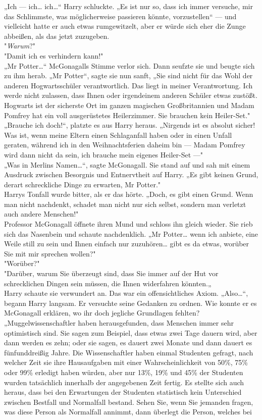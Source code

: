 {„Ich --- ich… ich…“ Harry schluckte. „Es ist nur so, dass ich immer versuche, mir das Schlimmste, was möglicherweise passieren könnte, vorzustellen“ --- und vielleicht hatte er auch etwas rumgewitzelt, aber er würde sich eher die Zunge abbeißen, als das jetzt zuzugeben.\\ "\emph{Warum}?"\\ "Damit ich es verhindern kann!"\\ „Mr Potter…“ McGonagalls Stimme verlor sich. Dann seufzte sie und beugte sich zu ihm herab. „Mr Potter“, sagte sie nun sanft, „Sie sind nicht für das Wohl der anderen Hogwartsschüler verantwortlich. Das liegt in meiner Verantwortung. Ich werde nicht zulassen, dass Ihnen oder irgendeinem anderen Schüler etwas zustößt. Hogwarts ist der sicherste Ort im ganzen magischen Großbritannien und Madam Pomfrey hat ein voll ausgerüstetes Heilerzimmer. Sie brauchen kein Heiler-Set."\\ „Brauche ich doch!“, platzte es aus Harry heraus. „Nirgends ist es absolut sicher! Was ist, wenn meine Eltern einen Schlaganfall haben oder in einen Unfall geraten, während ich in den Weihnachtsferien daheim bin --- Madam Pomfrey wird dann nicht da sein, ich brauche mein eigenes Heiler-Set ---"\\ „Was in Merlins Namen…“, sagte McGonagall. Sie stand auf und sah mit einem Ausdruck zwischen Besorgnis und Entnervtheit auf Harry. „Es gibt keinen Grund, derart schreckliche Dinge zu erwarten, Mr Potter."\\ Harrys Tonfall wurde bitter, als er das hörte. „Doch, es gibt einen Grund. Wenn man nicht nachdenkt, schadet man nicht nur sich selbst, sondern man verletzt auch andere Menschen!"\\ Professor McGonagall öffnete ihren Mund und schloss ihn gleich wieder. Sie rieb sich das Nasenbein und schaute nachdenklich. „Mr Potter… wenn ich anbiete, eine Weile still zu sein und Ihnen einfach nur zuzuhören… gibt es da etwas, worüber Sie mit mir sprechen wollen?"\\ "Worüber?"\\ "Darüber, warum Sie überzeugt sind, dass Sie immer auf der Hut vor schrecklichen Dingen sein müssen, die Ihnen widerfahren könnten.„\\ Harry schaute sie verwundert an. Das war ein offensichtliches Axiom. „Also…“, begann Harry langsam. Er versuchte seine Gedanken zu ordnen. Wie konnte er es McGonagall erklären, wo ihr doch jegliche Grundlagen fehlten? „Muggelwissenschaftler haben herausgefunden, dass Menschen immer sehr optimistisch sind. Sie sagen zum Beispiel, dass etwas zwei Tage dauern wird, aber dann werden es zehn; oder sie sagen, es dauert zwei Monate und dann dauert es fünfunddreißig Jahre. Die Wissenschaftler haben einmal Studenten gefragt, nach welcher Zeit sie ihre Hausaufgaben mit einer Wahrscheinlichkeit von 50\%, 75\% oder 99\% erledigt haben würden, aber nur 13\%, 19\% und 45\% der Studenten wurden tatsächlich innerhalb der angegebenen Zeit fertig. Es stellte sich auch heraus, dass bei den Erwartungen der Studenten statistisch kein Unterschied zwischen Bestfall und Normalfall bestand. Sehen Sie, wenn Sie jemanden fragen, was diese Person als Normalfall annimmt, dann überlegt die Person, welches bei }
